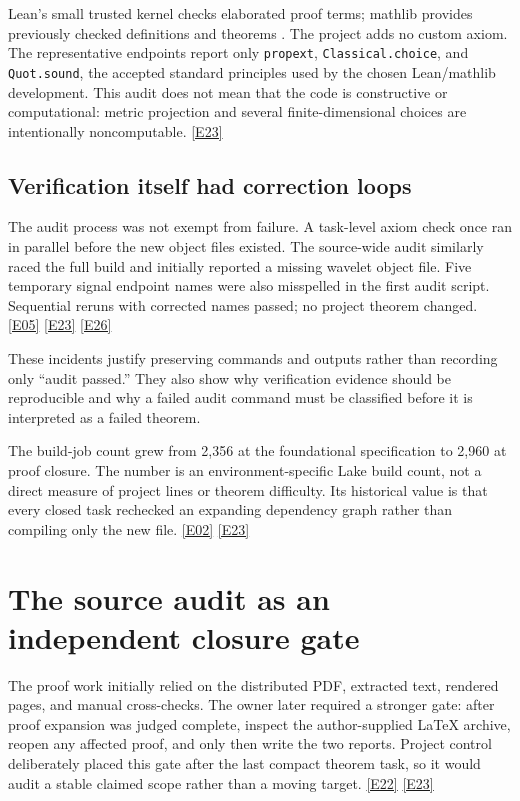 \documentclass[11pt,a4paper]{article}
\newcommand{\ev}[1]{%
  \hyperref[ev:#1]{\textcolor{ReportBlue}{\textsf{\scriptsize[#1]}}}}
\begin{document}
Lean's small trusted kernel checks elaborated proof terms; mathlib provides previously
checked definitions and theorems \cite{demoura2015lean,mathlib2020}. The project adds
no custom axiom. The representative endpoints report only
\texttt{propext}, \texttt{Classical.choice}, and \texttt{Quot.sound}, the accepted
standard principles used by the chosen Lean/mathlib development. This audit does not
mean that the code is constructive or computational: metric projection and several
finite-dimensional choices are intentionally noncomputable. \ev{E23}

\subsection{Verification itself had correction loops}

The audit process was not exempt from failure. A task-level axiom check once ran in
parallel before the new object files existed. The source-wide audit similarly raced
the full build and initially reported a missing wavelet object file. Five temporary
signal endpoint names were also misspelled in the first audit script. Sequential
reruns with corrected names passed; no project theorem changed. \ev{E05}\ev{E23}\ev{E26}

These incidents justify preserving commands and outputs rather than recording only
``audit passed.'' They also show why verification evidence should be reproducible and
why a failed audit command must be classified before it is interpreted as a failed
theorem.

The build-job count grew from 2,356 at the foundational specification to 2,960 at
proof closure. The number is an environment-specific Lake build count, not a direct
measure of project lines or theorem difficulty. Its historical value is that every
closed task rechecked an expanding dependency graph rather than compiling only the
new file. \ev{E02}\ev{E23}

\section{The source audit as an independent closure gate}
\label{sec:source-audit}

The proof work initially relied on the distributed PDF, extracted text, rendered
pages, and manual cross-checks. The owner later required a stronger gate: after proof
expansion was judged complete, inspect the author-supplied LaTeX archive, reopen any
affected proof, and only then write the two reports. Project control deliberately
placed this gate after the last compact theorem task, so it would audit a stable
claimed scope rather than a moving target. \ev{E22}\ev{E23}
\end{document}
